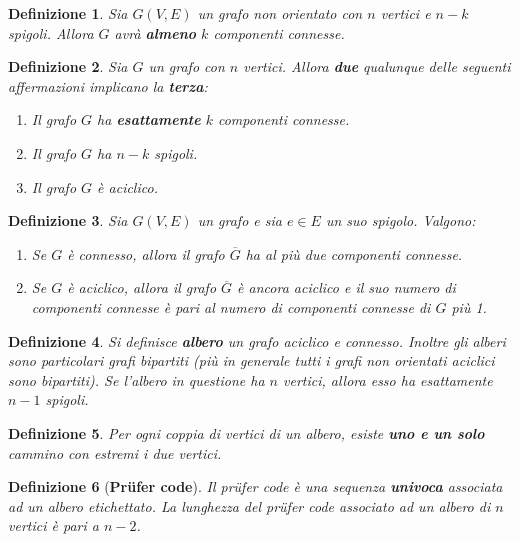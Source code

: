 \documentclass[10pt,a4paper,titlepage]{article}
\theoremstyle{break}
\newtheorem{myDef}{Definizione}
\theoremstyle{break}
\theoremstyle{break}
\begin{document}
\begin{myDef}
Sia $G(V, E)$ un grafo non orientato con $n$ vertici e $n-k$ spigoli. Allora $G$ avrà \textbf{almeno} $k$ componenti connesse.
\end{myDef}

\begin{myDef}
Sia $G$ un grafo con $n$ vertici. Allora \textbf{due} qualunque delle seguenti affermazioni implicano la \textbf{terza}:
\begin{enumerate}
\item Il grafo $G$ ha \textbf{esattamente} $k$ componenti connesse.
\item Il grafo $G$ ha $n-k$ spigoli.
\item Il grafo $G$ è aciclico.
\end{enumerate}
\end{myDef}

\begin{myDef}
Sia $G(V,E)$ un grafo e sia $e \in E$ un suo spigolo. Valgono:
\begin{enumerate}
\item Se $G$ è \textit{connesso}, allora il grafo $\overline{G}$ ha al più due componenti connesse.
\item Se $G$ è \textit{aciclico}, allora il grafo $\overline{G}$ è ancora aciclico e il suo numero di componenti
connesse è pari al numero di componenti connesse di $G$ più 1.
\end{enumerate}
\end{myDef}

\begin{myDef}
Si definisce \textbf{albero} un grafo aciclico e connesso. Inoltre gli alberi sono \textit{particolari} grafi bipartiti (\textit{più in generale tutti i grafi non orientati aciclici sono bipartiti}). Se l'albero in questione ha $n$ vertici, allora esso ha esattamente $n - 1$ spigoli.
\end{myDef}

\begin{myDef}
Per ogni coppia di vertici di un albero, esiste \textbf{uno e un solo} cammino con estremi i due vertici.
\end{myDef}

\begin{myDef}[\textbf{Pr{\"u}fer code}]
Il \textit{pr{\"u}fer code} è una sequenza \textbf{univoca} associata ad un albero etichettato. La lunghezza del \textit{pr{\"u}fer code} associato ad un albero di $n$ vertici è pari a $n-2$.
\end{myDef}
\end{document}
